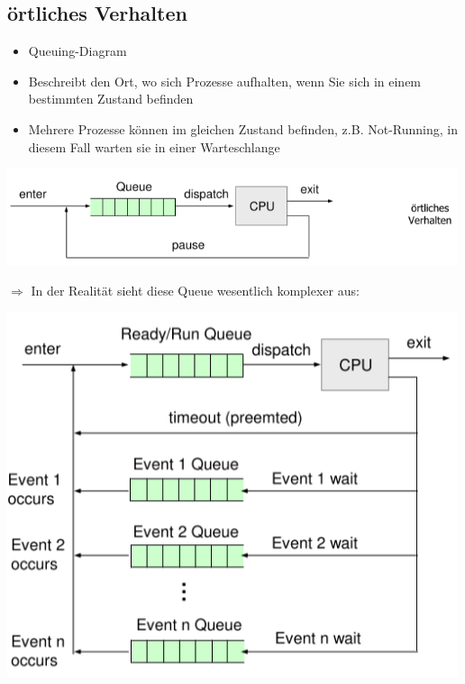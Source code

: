 \documentclass{report}
\newenvironment{Figure}
	{\par\medskip\noindent\minipage{\linewidth}}
	{\endminipage\par\medskip}
\theoremstyle{definition}
\theoremstyle{example}
\begin{document}
	\subsection{örtliches Verhalten}
\begin{itemize}
	\item Queuing-Diagram
	\item Beschreibt den Ort, wo sich Prozesse aufhalten, wenn Sie sich in einem bestimmten Zustand befinden
	\item Mehrere Prozesse können im gleichen Zustand befinden, z.B. Not-Running, in diesem Fall warten sie in einer Warteschlange
\end{itemize}	
	
\begin{Figure}
\centering
\includegraphics[width=500px]{img/ProzessausfuehrungOertlich.png}
	\label{fig:Prozessausführung einer CPU örtliches Verhalten}
\end{Figure}

$\Rightarrow$ In der Realität sieht diese Queue wesentlich komplexer aus:\\
\begin{Figure}
\centering
\includegraphics[width=500px]{img/ProzessausfuehrungOertlichReal.png}
	\label{fig:Prozessausführung einer CPU örtliches Verhalten (Realität)}
\end{Figure}
\end{document}
